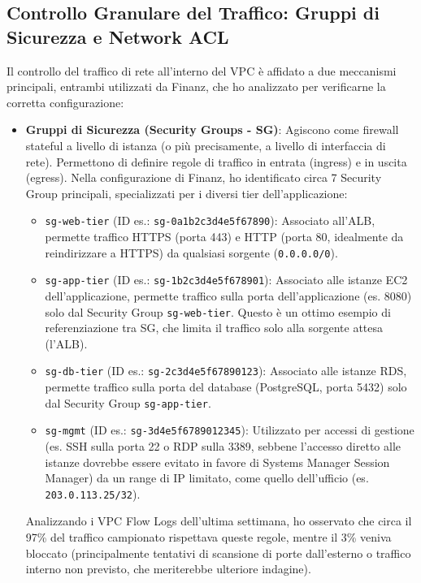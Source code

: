 \subsection{Controllo Granulare del Traffico: Gruppi di Sicurezza e Network ACL}
\label{subsec:sg-nacl_cap2}
Il controllo del traffico di rete all'interno del VPC è affidato a due meccanismi principali, entrambi utilizzati da Finanz, che ho analizzato per verificarne la corretta configurazione:
\begin{itemize}
    \item \textbf{Gruppi di Sicurezza (Security Groups - SG)}: Agiscono come firewall stateful a livello di istanza (o più precisamente, a livello di interfaccia di rete). Permettono di definire regole di traffico in entrata (ingress) e in uscita (egress). Nella configurazione di Finanz, ho identificato circa 7 Security Group principali, specializzati per i diversi tier dell'applicazione:
        \begin{itemize}
            \item \texttt{sg-web-tier} (ID es.: \texttt{sg-0a1b2c3d4e5f67890}): Associato all'ALB, permette traffico HTTPS (porta 443) e HTTP (porta 80, idealmente da reindirizzare a HTTPS) da qualsiasi sorgente (\texttt{0.0.0.0/0}).
            \item \texttt{sg-app-tier} (ID es.: \texttt{sg-1b2c3d4e5f678901}): Associato alle istanze EC2 dell'applicazione, permette traffico sulla porta dell'applicazione (es. 8080) solo dal Security Group \texttt{sg-web-tier}. Questo è un ottimo esempio di referenziazione tra SG, che limita il traffico solo alla sorgente attesa (l'ALB).
            \item \texttt{sg-db-tier} (ID es.: \texttt{sg-2c3d4e5f67890123}): Associato alle istanze RDS, permette traffico sulla porta del database (PostgreSQL, porta 5432) solo dal Security Group \texttt{sg-app-tier}.
            \item \texttt{sg-mgmt} (ID es.: \texttt{sg-3d4e5f6789012345}): Utilizzato per accessi di gestione (es. SSH sulla porta 22 o RDP sulla 3389, sebbene l'accesso diretto alle istanze dovrebbe essere evitato in favore di Systems Manager Session Manager) da un range di IP limitato, come quello dell'ufficio (es. \texttt{203.0.113.25/32}).
        \end{itemize}
        Analizzando i VPC Flow Logs dell'ultima settimana, ho osservato che circa il 97\% del traffico campionato rispettava queste regole, mentre il 3\% veniva bloccato (principalmente tentativi di scansione di porte dall'esterno o traffico interno non previsto, che meriterebbe ulteriore indagine).

\end{itemize}
